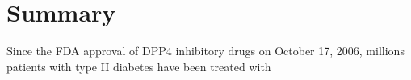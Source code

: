 \section{\label{chap:Sum} Summary}
Since the FDA approval of DPP4 inhibitory drugs on October 17, 2006, millions patients with type II diabetes have been treated with 
